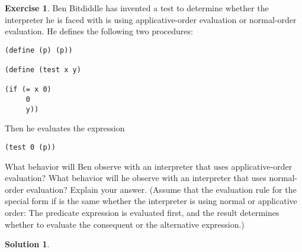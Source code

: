 \documentclass[11pt]{article}
\theoremstyle{definition}
\newtheorem{exe}{Exercise}[section]
\newtheorem{sol}{Solution}[section]
\begin{document}
\begin{exe}
    Ben Bitdiddle has invented a test to determine whether the interpreter he is faced with is using applicative-order evaluation or normal-order evaluation. He defines the following two procedures:
    \begin{verbatim}
(define (p) (p))

(define (test x y)

(if (= x 0)
     0
     y))
    \end{verbatim}
    Then he evaluates the expression
    \begin{verbatim}
(test 0 (p))
    \end{verbatim}
    What behavior will Ben observe with an interpreter that uses applicative-order evaluation? What behavior will he observe with an interpreter that uses normal-order evaluation? Explain your answer. (Assume that the evaluation rule for the special form if is the same whether the interpreter is using normal or applicative order: The predicate expression is evaluated first, and the result determines whether to evaluate the consequent or the alternative expression.)
\end{exe}
\begin{sol}
    
\end{sol}
\end{document}
